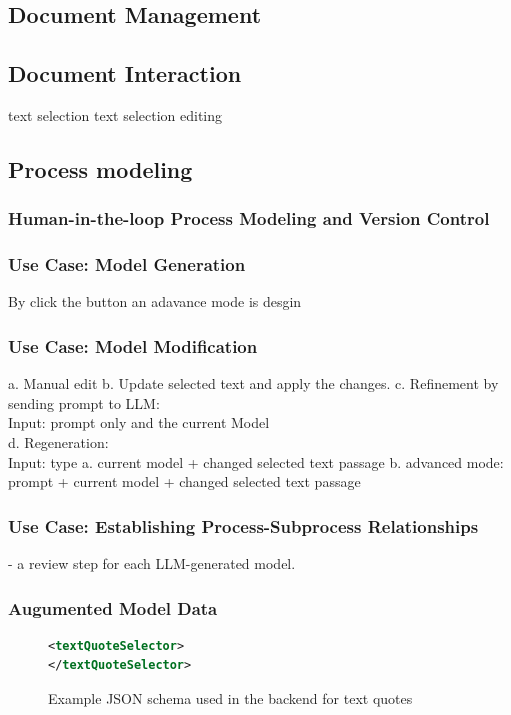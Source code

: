 \subsection{Document Management}

\subsection{Document Interaction}
text selection
text selection editing
\subsection{Process modeling}

\subsubsection{Human-in-the-loop Process Modeling and Version Control}

\subsubsection{Use Case: Model Generation}
By click the button an adavance mode is desgin 
\subsubsection{Use Case: Model Modification}
a. Manual edit
b. Update selected text and apply the changes. 
c. Refinement by sending prompt to LLM:\\
   Input: prompt only and the current Model\\
d. Regeneration:\\
   Input: type a. current model + changed selected text passage b. advanced mode: prompt + current model + changed selected text passage
   
\subsubsection{Use Case: Establishing Process-Subprocess Relationships}

- a review step for each LLM-generated model.
\subsubsection{Augumented Model Data}


\begin{figure}[H]
  \centering
  \caption{Example JSON schema used in the backend for text quotes}
  \label{fig:imp_backend_schema_example}
  \begin{lstlisting}[language=XML]
<textQuoteSelector>
</textQuoteSelector>
  \end{lstlisting}
\end{figure}


